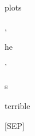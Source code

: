 \documentclass[varwidth=150mm]{standalone}
\begin{document}
\begin{CJK*}{UTF8}{gbsn}
{{{\colorbox{red!6.57902717590332}{\strut plots} \colorbox{red!0.0}{\strut ,} \colorbox{red!12.998918533325195}{\strut he} \colorbox{red!0.0}{\strut '} \colorbox{red!6.759944438934326}{\strut s} \colorbox{red!5.647579193115234}{\strut terrible} \colorbox{red!4.0825347900390625}{\strut [SEP]}
}}}
\end{CJK*}
\end{document}
